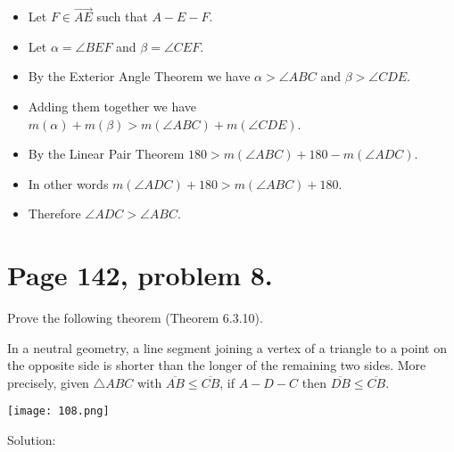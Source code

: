 \documentclass[12pt,openany]{report}
\begin{document}
\begin{itemize}

\item[]
Let $F\in\overrightarrow{AE}$ such that $A{-}E{-}F$.

\item[]
Let $\alpha=\angle BEF$ and $\beta=\angle CEF$.

\item[]
By the Exterior Angle Theorem we have $\alpha>\angle ABC$ and $\beta>\angle CDE$.

\item[]
Adding them together we have $m(\alpha)+m(\beta)>m(\angle ABC)+m(\angle CDE)$.

\item[]
By the Linear Pair Theorem $180>m(\angle ABC)+180-m(\angle ADC)$.

\item[]
In other words $m(\angle ADC)+180>m(\angle ABC)+180$.

\item[]
Therefore $\angle ADC>\angle ABC$.

\end{itemize}

\newpage

\section*{Page 142, problem 8.}

Prove the following theorem (Theorem 6.3.10).

\medskip
\noindent
In a neutral geometry, a line segment joining a vertex of
a triangle to a point on the opposite side is shorter than
the longer of the remaining two sides.
More precisely, given $\triangle ABC$ with $\overline{AB}\le\overline{CB}$,
if $A{-}D{-}C$ then $\overline{DB}\le\overline{CB}$.

\texttt{[image: 108.png]}

\noindent
Solution:
\end{document}
